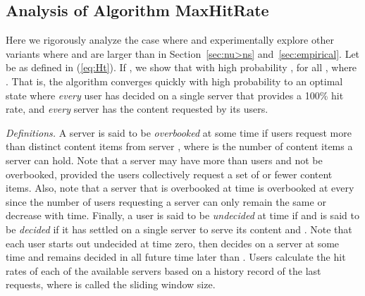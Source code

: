 \documentclass[conference]{IEEEtran}
\begin{document}
\subsection{Analysis of Algorithm MaxHitRate}
Here we rigorously analyze the case where  and experimentally explore other variants where  and  are larger than  in Section~\ref{sec:nu>ns} and~\ref{sec:empirical}.  Let    be as defined in (\ref{eq:Ht}). If , we show that with high probability , for all , where . That is,  the algorithm converges quickly with high probability to an optimal state where {\em every} user has decided on a single server that provides a 100\% hit rate,  and {\em every} server has the content requested by its users.

{\em Definitions.} A server   is said to be {\em overbooked} at some time  if users request more than  distinct content items from server , where  is the number of content items a server can hold. Note that a server may have more than  users and not be overbooked, provided the users collectively request a set of  or fewer content items. Also, note that a server that is overbooked at time  is overbooked at every  since the number of users requesting  a server can only remain the same or decrease with time. Finally, a user  is said to be {\em undecided} at time   if    and is said to be {\em decided} if it has settled on a single server to serve its content and . Note that each user starts out undecided at  time zero, then decides on a server at some time   and remains decided in all future time later than . Users calculate the hit rates of each of the available servers based on a history record of the last  requests, where  is called the sliding window size. 
\end{document}
